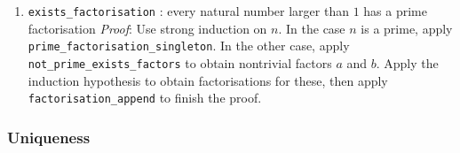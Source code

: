 \documentclass{article}
\begin{document}
\begin{enumerate}
\item \verb|exists_factorisation| : every natural number larger than $1$ has a prime factorisation
\newline \textit{Proof}: Use strong induction on $n$. In the case $n$ is a prime, apply 
\verb|prime_factorisation_singleton|. In the other case, apply \verb|not_prime_exists_factors| to
obtain nontrivial factors $a$ and $b$. Apply the induction hypothesis to obtain factorisations
for these, then apply \verb|factorisation_append| to finish the proof.

\end{enumerate}

\subsubsection{Uniqueness}
\end{document}
